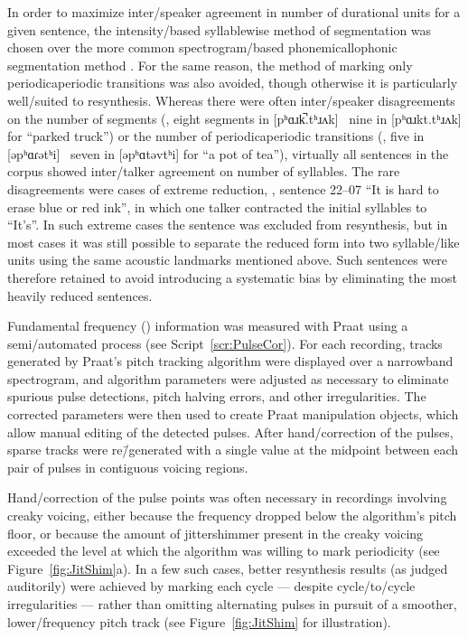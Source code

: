 In order to maximize inter\-/speaker agreement in number of durational units for a given sentence, the intensity\-/based syllablewise method of segmentation was chosen over the more common spectrogram\-/based phonemic\slsh{}allophonic segmentation method \citep[\eg][]{PetersonLehiste1960, TurkEtAl2006}.  For the same reason, the method of marking only periodic\slsh{}aperiodic transitions was also avoided, though otherwise it is particularly well\-/suited to \psola{} resynthesis.  Whereas there were often inter\-/speaker disagreements on the number of segments (\eg, eight segments in [pʰɑɹk̚.tʰɹʌk] \vs\ nine in [pʰɑɹkt.tʰɹʌk] for “parked truck”) or the number of periodic\slsh{}aperiodic transitions (\eg, five in [əpʰɑɾətʰi] \vs\ seven in [əpʰɑtəvtʰi] for “a pot of tea”), virtually all sentences in the corpus showed inter\-/talker agreement on number of syllables.  The rare disagreements were cases of extreme reduction, \eg, sentence 22–07 “It is hard to erase blue or red ink”, in which one talker contracted the initial syllables to “It’s”.  In such extreme cases the sentence was excluded from resynthesis, but in most cases it was still possible to separate the reduced form into two syllable\-/like units using the same acoustic landmarks mentioned above.  Such sentences were therefore retained to avoid introducing a systematic bias by eliminating the most heavily reduced sentences.

Fundamental frequency (\fo) information was measured with Praat using a semi\-/automated process (see Script~\ref{scr:PulseCor}).  For each recording, \fo{} tracks generated by Praat’s pitch tracking algorithm were displayed over a narrowband spectrogram, and algorithm parameters were adjusted as necessary to eliminate spurious pulse detections, pitch halving errors, and other irregularities.  The corrected parameters were then used to create Praat manipulation objects, which allow manual editing of the detected pulses.  After hand\-/correction of the pulses, sparse \fo{} tracks were re\=/generated with a single value at the midpoint between each pair of pulses in contiguous voicing regions.

Hand\-/correction of the pulse points was often necessary in recordings involving creaky voicing, either because the frequency dropped below the algorithm’s pitch floor, or because the amount of jitter\slsh{}shimmer present in the creaky voicing exceeded the level at which the algorithm was willing to mark periodicity (see Figure~\ref{fig:JitShim}a).  In a few such cases, better resynthesis results (as judged auditorily) were achieved by marking each cycle — despite cycle\-/to\-/cycle irregularities — rather than omitting alternating pulses in pursuit of a smoother, lower\-/frequency pitch track (see Figure~\ref{fig:JitShim} for illustration).  %


